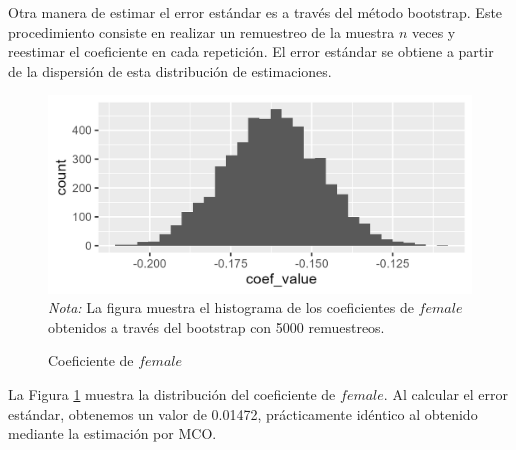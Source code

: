 \documentclass[12pt,a4paper,onecolumn]{article}
\begin{document}
Otra manera de estimar el error estándar es a través del método bootstrap. 
Este procedimiento consiste en realizar un remuestreo de la muestra $n$ veces y reestimar el coeficiente en cada repetición. 
El error estándar se obtiene a partir de la dispersión de esta distribución de estimaciones.

\begin{figure}[H]
\caption{Coeficiente de $female$} \label{fig:female}
    \includegraphics[scale=0.75]{../views/sd_fwl_hist.png}   
 \flushleft
 \textit{Nota:} La figura muestra el histograma de los coeficientes de $female$ obtenidos a través del bootstrap con 5000 remuestreos.
\end{figure}

La Figura \ref{fig:female} muestra la distribución del coeficiente de $female$. 
Al calcular el error estándar, obtenemos un valor de 0.01472, prácticamente idéntico al obtenido mediante la estimación por MCO.
\end{document}
